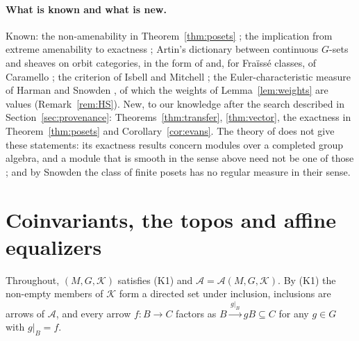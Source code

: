 \documentclass[11pt,a4paper]{article}
\theoremstyle{definition}
\newcommand{\A}{\mathcal{A}}
\newcommand{\K}{\mathcal{K}}
\begin{document}
\paragraph{What is known and what is new.} Known: the non-amenability in
Theorem~\ref{thm:posets} \cite{KS}; the implication from extreme amenability
to exactness \cite{Ev}; Artin's dictionary between continuous $G$-sets and
sheaves on orbit categories, in the form of \cite{DLLX} and, for Fra\"iss\'e
classes, of Caramello \cite[Theorem~2.9, Proposition~2.10]{Ca}; the criterion
of Isbell and Mitchell \cite{IM}; the Euler-characteristic measure of Harman
and Snowden \cite{HS}, of which the weights of Lemma~\ref{lem:weights} are
values (Remark~\ref{rem:HS}). New, to our knowledge after the search
described in Section~\ref{sec:provenance}: Theorems~\ref{thm:transfer},
\ref{thm:vector}, the exactness in Theorem~\ref{thm:posets} and
Corollary~\ref{cor:evans}. The theory of \cite{HS} does not give these
statements: its exactness results concern modules over a completed group
algebra, and a module that is smooth in the sense above need not be one of
those \cite[Remark~10.10]{HS}; and by Snowden \cite[Proposition~8.2]{Sn} the
class of finite posets has no regular measure in their sense.

\section{Coinvariants, the topos and affine equalizers}\label{sec:dict}

Throughout, $(M,G,\K)$ satisfies (K1) and $\A=\A(M,G,\K)$. By (K1) the
non-empty members of $\K$ form a directed set under inclusion, inclusions
are arrows of $\A$, and every arrow $f\colon B\to C$ factors as
$B\xrightarrow{\,g|_B\,}gB\subseteq C$ for any $g\in G$ with $g|_B=f$.
\end{document}
